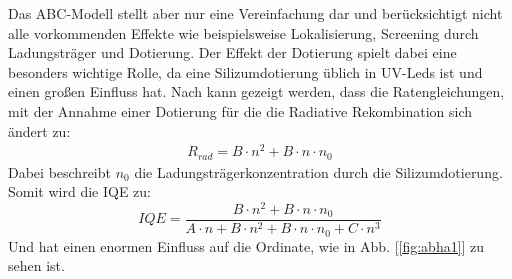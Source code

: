 \vspace{1cm}
\raggedright
\newpage
%
Das ABC-Modell stellt aber nur eine Vereinfachung dar und berücksichtigt nicht alle vorkommenden Effekte wie beispielsweise Lokalisierung, Screening durch Ladungsträger und Dotierung. 
Der Effekt der Dotierung spielt dabei eine besonders wichtige Rolle, da eine Silizumdotierung üblich in UV-Leds ist und einen großen Einfluss hat.
Nach \cite{schub} kann gezeigt werden, dass die Ratengleichungen, mit der Annahme einer Dotierung für die 
die Radiative Rekombination sich ändert zu:
\begin{align}
    R_{rad} = B \cdot n^2 + B \cdot n \cdot n_{0}
\end{align}
Dabei beschreibt $n_{0}$ die Ladungsträgerkonzentration durch die Silizumdotierung. 
Somit wird die IQE zu:
\begin{equation}
    IQE = \frac{B \cdot n^2 + B \cdot n \cdot n_{0}}{A \cdot n + B \cdot n^2  + B \cdot n \cdot n_{0}+ C \cdot n^3} 
    \label{eq:dopediqe}
\end{equation}
Und hat einen enormen Einfluss auf die Ordinate, wie in Abb. [\ref{fig:abha1}] zu sehen ist.
%